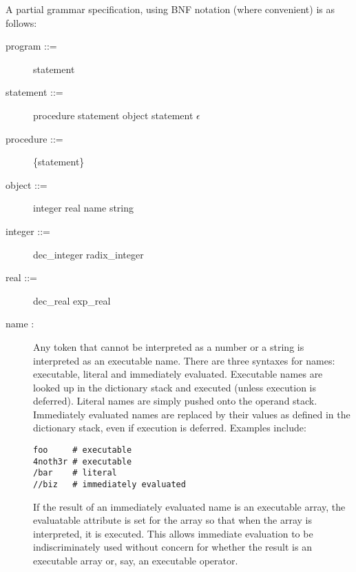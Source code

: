 A partial grammar specification, using BNF notation (where convenient) is as
follows:

\begin{description}
\item[{\lt}program{\gt} ::= ] {\lt}statement{\gt}

\item[{\lt}statement{\gt} ::= ] {\lt}procedure{\gt} {\lt}statement{\gt} {\pipe}
{\lt}object{\gt} {\lt}statement{\gt} {\pipe} $\epsilon$

\item[{\lt}procedure{\gt} ::= ] \{{\lt}statement{\gt}\}

\item[{\lt}object{\gt} ::= ] {\lt}integer{\gt} {\pipe} {\lt}real{\gt} {\pipe}
{\lt}name{\gt} {\pipe} {\lt}string{\gt}

\item[{\lt}integer{\gt} ::= ] {\lt}dec\_integer{\gt} {\pipe}
{\lt}radix\_integer{\gt}

\item[{\lt}real{\gt} ::= ] {\lt}dec\_real{\gt} {\pipe} {\lt}exp\_real{\gt}

\item[{\lt}name{\gt} : ] Any token that cannot be interpreted as a number or a
string is interpreted as an executable name.  There are three syntaxes for
names: executable, literal and immediately evaluated.  Executable names are
looked up in the dictionary stack and executed (unless execution is deferred).
Literal names are simply pushed onto the operand stack.  Immediately evaluated
names are replaced by their values as defined in the dictionary stack, even if
execution is deferred.  Examples include:
\begin{verbatim}
foo     # executable
4noth3r # executable
/bar    # literal
//biz   # immediately evaluated
\end{verbatim}

If the result of an immediately evaluated name is an executable array, the
evaluatable attribute is set for the array so that when the array is
interpreted, it is executed.  This allows immediate evaluation to be
indiscriminately used without concern for whether the result is an executable
array or, say, an executable operator.


\end{description}
